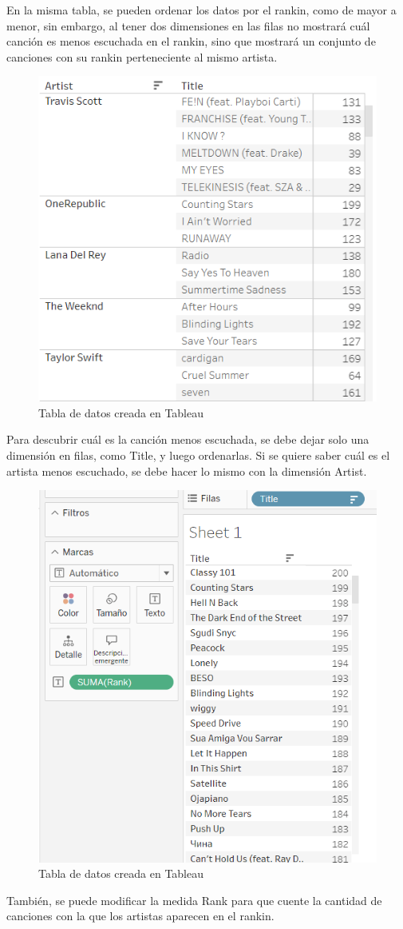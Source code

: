 \documentclass[a4paper, 12pt]{book}
\begin{document}
En la misma tabla, se pueden ordenar los datos por el rankin, como de mayor a menor, sin embargo, al tener dos dimensiones en las filas no mostrará cuál canción es menos escuchada en el rankin, sino que mostrará un conjunto de canciones con su rankin perteneciente al mismo artista.
\begin{figure}[H] 
	\centering 
	\includegraphics[width=0.5\linewidth]{tabla2.png}
	\caption{Tabla de datos creada en Tableau}
\end{figure}
Para descubrir cuál es la canción menos escuchada, se debe dejar solo una dimensión en filas, como Title, y luego ordenarlas. Si se quiere saber cuál es el artista menos escuchado, se debe hacer lo mismo con la dimensión Artist.
\begin{figure}[H] 
	\centering 
	\includegraphics[width=0.7\linewidth]{tabla3.png}
	\caption{Tabla de datos creada en Tableau}
\end{figure}
También, se puede modificar la medida Rank para que cuente la cantidad de canciones con la que los artistas aparecen en el rankin.
\end{document}

